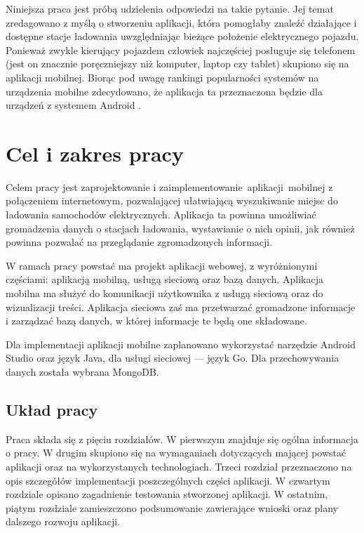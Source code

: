 Niniejsza praca jest próbą udzielenia odpowiedzi na takie pytanie. Jej temat zredagowano z myślą o stworzeniu aplikacji, która pomogłaby znaleźć działające i dostępne stacje ładowania uwzględniając bieżące położenie elektrycznego pojazdu. Ponieważ zwykle kierujący pojazdem człowiek najczęściej posługuje się telefonem (jest on znacznie poręczniejszy niż komputer, laptop czy tablet) skupiono się na aplikacji mobilnej. Biorąc pod uwagę rankingi popularności systemów na urządzenia mobilne zdecydowano, że aplikacja ta przeznaczona będzie dla urządzeń z systemem Android \cite{avi1}.


\section{Cel i zakres pracy}
Celem pracy jest zaprojektowanie i zaimplementowanie aplikacji mobilnej z połączeniem internetowym, pozwalającej ułatwiającą wyszukiwanie miejsc do ładowania samochodów elektrycznych. Aplikacja ta powinna umożliwiać gromadzenia danych o stacjach ładowania, wystawianie o nich opinii, jak również powinna pozwalać na przeglądanie zgromadzonych informacji. 

W ramach pracy powstać ma projekt aplikacji webowej, z wyróżnionymi częściami: aplikacją mobilną, usługą sieciową oraz bazą danych.
Aplikacja mobilna ma służyć do komunikacji użytkownika z usługą sieciową oraz do wizualizacji treści.
Aplikacja sieciowa zaś ma przetwarzać gromadzone informacje i zarządzać bazą danych, w której informacje te będą one składowane.

Dla implementacji aplikacji mobilne zaplanowano wykorzystać narzędzie Android Studio oraz język Java, dla usługi sieciowej — język Go. Dla przechowywania danych została wybrana MongoDB.

\subsection{Układ pracy}
Praca składa się z pięciu rozdziałów. W pierwszym znajduje się ogólna informacja o pracy.
W drugim skupiono się na wymaganiach dotyczących mającej powstać aplikacji oraz na wykorzystanych technologiach.
Trzeci rozdział przeznaczono na opis szczegółów implementacji poszczególnych części aplikacji.
W czwartym rozdziale opisano zagadnienie testowania stworzonej aplikacji.
W ostatnim, piątym rozdziale zamieszczono podsumowanie zawierające wnioski oraz plany dalszego rozwoju aplikacji.